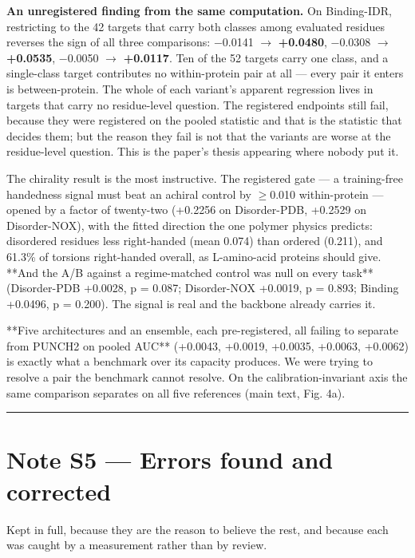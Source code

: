 \textbf{An unregistered finding from the same computation.} On Binding-IDR,
restricting to the 42 targets that carry both classes among evaluated residues
reverses the sign of all three comparisons:  −0.0141 $\rightarrow$ \textbf{+0.0480},
 −0.0308 $\rightarrow$ \textbf{+0.0535},  −0.0050 $\rightarrow$ \textbf{+0.0117}. Ten of the 52
targets carry one class, and a single-class target contributes no within-protein
pair at all --- every pair it enters is between-protein. The whole of each
variant's apparent regression lives in targets that carry no residue-level
question. The registered endpoints still fail, because they were registered on
the pooled statistic and that is the statistic that decides them; but the reason
they fail is not that the variants are worse at the residue-level question. This
is the paper's thesis appearing where nobody put it.

The chirality result is the most instructive. The registered gate --- a
training-free handedness signal must beat an achiral control by $\geq$0.010
within-protein --- opened by a factor of twenty-two (+0.2256 on Disorder-PDB,
+0.2529 on Disorder-NOX), with the fitted direction the one polymer physics
predicts: disordered residues less right-handed (mean 0.074) than ordered
(0.211), and 61.3\% of torsions right-handed overall, as L-amino-acid proteins
should give. **And the A/B against a regime-matched control was null on every
task** (Disorder-PDB +0.0028, p = 0.087; Disorder-NOX +0.0019, p = 0.893;
Binding +0.0496, p = 0.200). The signal is real and the backbone already
carries it.

**Five architectures and an ensemble, each pre-registered, all failing to
separate from PUNCH2 on pooled AUC** (+0.0043, +0.0019, +0.0035, +0.0063,
+0.0062) is exactly what a benchmark over its capacity produces. We were trying
to resolve a pair the benchmark cannot resolve. On the calibration-invariant
axis the same comparison separates on all five references (main text, Fig. 4a).


\vspace{0.5em}\hrule\vspace{0.8em}



\section*{Note S5 --- Errors found and corrected}

Kept in full, because they are the reason to believe the rest, and because each
was caught by a measurement rather than by review.

